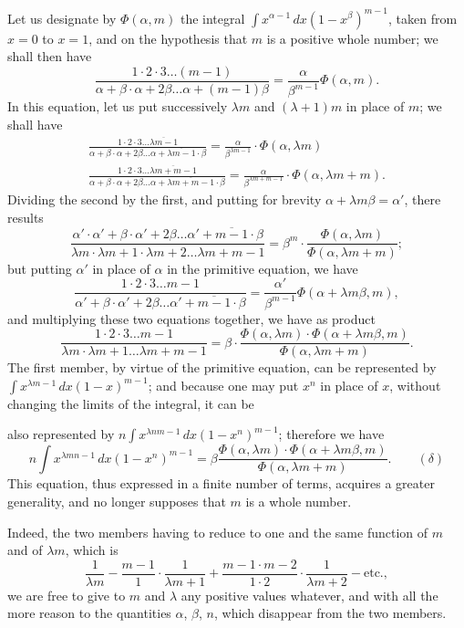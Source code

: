 \documentclass{article}
\begin{document}
Let us designate by $\Phi(\alpha,m)$ the integral $\displaystyle\int x^{\alpha-1}\,dx(1-x^{\beta})^{m-1}$, taken from $x=0$ to $x=1$, and on the hypothesis that $m$ is a positive whole number; we shall then have
\[ \frac{1\cdot 2\cdot 3\ldots(m-1)}{\alpha+\beta\cdot\alpha+2\beta\ldots\alpha+(m-1)\beta}=\frac{\alpha}{\beta^{m-1}}\Phi(\alpha,m). \]
In this equation, let us put successively $\lambda m$ and $(\lambda+1)m$ in place of $m$; we shall have
\[ \begin{gathered} \frac{1\cdot 2\cdot 3\ldots\overline{\lambda m-1}}{\alpha+\beta\cdot\alpha+2\beta\ldots\alpha+\overline{\lambda m-1}\cdot\beta}=\frac{\alpha}{\beta^{\lambda m-1}}\cdot\Phi(\alpha,\lambda m)\\ \frac{1\cdot 2\cdot 3\ldots\overline{\lambda m+m-1}}{\alpha+\beta\cdot\alpha+2\beta\ldots\alpha+\overline{\lambda m+m-1}\cdot\beta}=\frac{\alpha}{\beta^{\lambda m+m-1}}\cdot\Phi(\alpha,\lambda m+m). \end{gathered} \]
Dividing the second by the first, and putting for brevity $\alpha+\lambda m\beta=\alpha'$, there results
\[ \frac{\alpha'\cdot\alpha'+\beta\cdot\alpha'+2\beta\ldots\alpha'+\overline{m-1}\cdot\beta}{\lambda m\cdot\lambda m+1\cdot\lambda m+2\ldots\lambda m+m-1}=\beta^{m}\cdot\frac{\Phi(\alpha,\lambda m)}{\Phi(\alpha,\lambda m+m)}; \]
but putting $\alpha'$ in place of $\alpha$ in the primitive equation, we have
\[ \frac{1\cdot 2\cdot 3\ldots m-1}{\alpha'+\beta\cdot\alpha'+2\beta\ldots\alpha'+\overline{m-1}\cdot\beta}=\frac{\alpha'}{\beta^{m-1}}\Phi(\alpha+\lambda m\beta,m), \]
and multiplying these two equations together, we have as product
\[ \frac{1\cdot 2\cdot 3\ldots m-1}{\lambda m\cdot\lambda m+1\ldots\lambda m+m-1}=\beta\cdot\frac{\Phi(\alpha,\lambda m)\cdot\Phi(\alpha+\lambda m\beta,m)}{\Phi(\alpha,\lambda m+m)}. \]
The first member, by virtue of the primitive equation, can be represented by $\displaystyle\int x^{\lambda m-1}\,dx(1-x)^{m-1}$; and because one may put $x^{n}$ in place of $x$, without changing the limits of the integral, it can be

also represented by $\displaystyle n\int x^{\lambda nm-1}\,dx(1-x^{n})^{m-1}$; therefore we have
\[ n\int x^{\lambda mn-1}\,dx(1-x^{n})^{m-1}=\beta\frac{\Phi(\alpha,\lambda m)\cdot\Phi(\alpha+\lambda m\beta,m)}{\Phi(\alpha,\lambda m+m)}.\qquad(\delta) \]
This equation, thus expressed in a finite number of terms, acquires a greater generality, and no longer supposes that $m$ is a whole number.

Indeed, the two members having to reduce to one and the same function of $m$ and of $\lambda m$, which is
\[ \frac{1}{\lambda m}-\frac{m-1}{1}\cdot\frac{1}{\lambda m+1}+\frac{m-1\cdot m-2}{1\cdot 2}\cdot\frac{1}{\lambda m+2}-\text{etc.}, \]
we are free to give to $m$ and $\lambda$ any positive values whatever, and with all the more reason to the quantities $\alpha$, $\beta$, $n$, which disappear from the two members.
\end{document}
